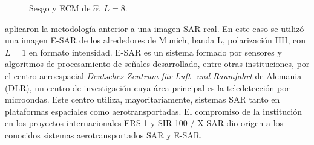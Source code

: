 \begin{figure}[htb]
	\centering
	\caption{\label{ASTL8} \small Sesgo y ECM de $\widehat{\alpha}$, $L=8$.}
\end{figure}

\citet{APSAR2013ParameterEstimationStochasticDistances} aplicaron la metodología anterior a una imagen SAR real. En este caso se utilizó una imagen E-SAR \citep{Horn1996} de los alrededores de Munich, banda L, polarización HH, con $L=1$ en formato intensidad.
E-SAR es un sistema formado por sensores y algoritmos de procesamiento de señales desarrollado, entre otras instituciones, por el centro aeroespacial \textit{Deutsches Zentrum für Luft- und Raumfahrt} de Alemania (DLR), un centro de investigación cuya área principal es la teledetección por microondas.  
Este centro utiliza, mayoritariamente, sistemas SAR tanto en plataformas espaciales como aerotransportadas. 
El compromiso de la institución en los proyectos internacionales ERS-1 y SIR-100 / X-SAR dio origen a los conocidos sistemas aerotransportados SAR y E-SAR. 

